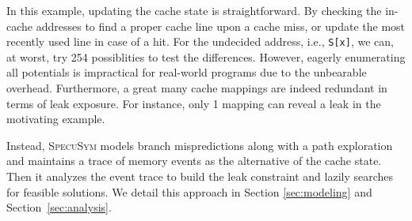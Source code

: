 \documentclass[sigconf]{acmart}
\newcommand\ignore[1]{}
\newcommand{\SpecuSym}{\textsc{SpecuSym} }
\begin{document}
\ignore{
In Figure~\ref{fig:3a}, the speculative state $s'$ inherits the cache 
state from $s$, maps \texttt{v2} into a cache line, and merges back the updated 
cache state to state $s$ before its termination, as formally stated in Algorithm
\ref{alg:specusym} (lines 23-25). 
}


In this example, updating the cache state is straightforward. By checking the 
in-cache addresses to find a proper cache line upon a cache miss, or update the 
most recently used line in case of a hit. For the undecided address, i.e., 
\texttt{S[x]}, we can, at worst, try 254 possiblities to test the differences. 
However, eagerly enumerating all potentials is impractical for real-world programs 
due to the unbearable overhead. Furthermore, a great many cache mappings are
indeed redundant in terms of leak exposure. For instance, only 1 mapping can 
reveal a leak in the motivating example. 




Instead, \SpecuSym models branch mispredictions along with a path exploration
and maintains a trace of memory events as the alternative of the cache state. 
Then it analyzes the event trace to build the leak constraint and lazily 
searches for feasible solutions. We detail this approach in Section
\ref{sec:modeling} and Section~\ref{sec:analysis}. 
\end{document}
